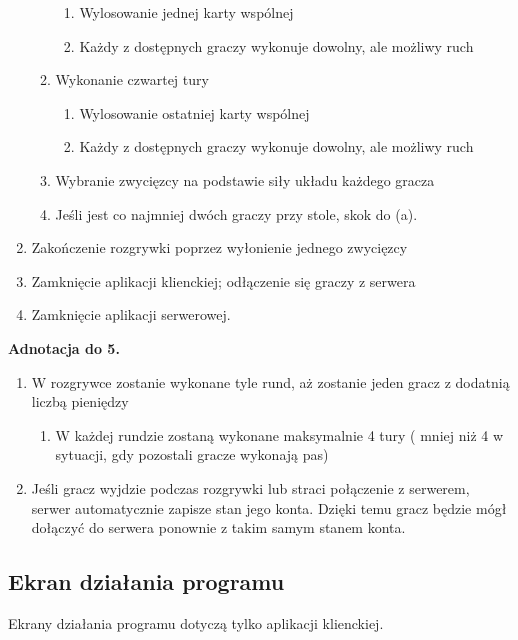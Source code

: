 \documentclass{article}
\begin{document}
\begin{enumerate}
\begin{enumerate}
\begin{enumerate}
                    \item Wylosowanie jednej karty wspólnej
                    \item Każdy z dostępnych graczy wykonuje dowolny, ale możliwy ruch
                \end{enumerate}
                \item Wykonanie czwartej tury
                \begin{enumerate}
                    \item Wylosowanie ostatniej karty wspólnej
                    \item Każdy z dostępnych graczy wykonuje dowolny, ale możliwy ruch
                \end{enumerate}
                \item Wybranie zwycięzcy na podstawie siły układu każdego gracza
                \item Jeśli jest co najmniej dwóch graczy przy stole, skok do (a).
            \end{enumerate}
            \item Zakończenie rozgrywki poprzez wyłonienie jednego zwycięzcy
            \item Zamknięcie aplikacji klienckiej; odłączenie się graczy z serwera
            \item Zamknięcie aplikacji serwerowej.
        \end{enumerate}

        \textbf{Adnotacja do 5.}
        \begin{enumerate}
                \item W rozgrywce zostanie wykonane tyle rund, aż zostanie jeden gracz z dodatnią liczbą pieniędzy
                \begin{enumerate}
                    \item W każdej rundzie zostaną wykonane maksymalnie 4 tury ( mniej niż 4 w sytuacji, gdy pozostali gracze wykonają pas)
                \end{enumerate}
                \item Jeśli gracz wyjdzie podczas rozgrywki lub straci połączenie z serwerem, serwer automatycznie zapisze stan jego konta. Dzięki temu gracz będzie mógł dołączyć do serwera ponownie z takim samym stanem konta.
            \end{enumerate}
            
    \newpage
    \subsection{Ekran działania programu}
        Ekrany działania programu dotyczą tylko aplikacji klienckiej.
\end{document}
